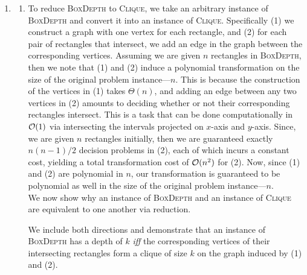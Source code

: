\documentclass{article}
\begin{document}
\begin{enumerate}[leftmargin={*}, font={\bf}, label={\arabic*.}, ref={\arabic*}]
  \item \label{qst:1}
    \begin{enumerate}[ref={(\alph*)}]
      \item \label{qst:1a}
        To reduce \textsc{BoxDepth} to \textsc{Clique}, we take an arbitrary instance of
        \textsc{BoxDepth} and convert it into an instance of \textsc{Clique}. Specifically
        (1) we construct a graph with one vertex for each rectangle, and (2) for each pair
        of rectangles that intersect, we add an edge in the graph between the corresponding
        vertices. Assuming we are given $n$ rectangles in \textsc{BoxDepth}, then we note
        that (1) and (2) induce a polynomial transformation on the size of the original
        problem instance---$n$. This is because the construction of the vertices in (1)
        takes $\Theta(n)$, and adding an edge between any two vertices in (2) amounts to
        deciding whether or not their corresponding rectangles intersect. This is a task
        that can be done computationally in $\operatorname*{\mathcal{O}}(1)$ via intersecting the intervals projected
        on $x$-axis and $y$-axis. Since, we are given $n$ rectangles initially, then we are
        guaranteed exactly $n(n-1)/2$ decision problems in (2), each of which incurs a constant
        cost, yielding a total transformation cost of $\operatorname*{\mathcal{O}}(n^2)$ for (2). Now, since (1) and
        (2) are polynomial in $n$, our transformation is guaranteed to be polynomial as well
        in the size of the original problem instance---$n$. \\

        We now show why an instance of \textsc{BoxDepth} and an instance of \textsc{Clique}
        are equivalent to one another via reduction. \\

        \begin{proof*}
          We include both directions and demonstrate that an instance of \textsc{BoxDepth}
          has a depth of $k$ \textit{iff} the corresponding vertices of their intersecting
          rectangles form a clique of size $k$ on the graph induced by (1) and (2).
\end{proof*}
\end{enumerate}
\end{enumerate}
\end{document}
